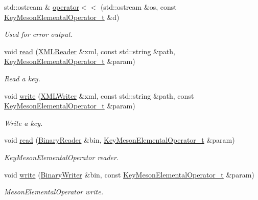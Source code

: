 \begin{DoxyCompactItemize}
std\+::ostream \& \mbox{\hyperlink{namespaceHadron_a24d0db7f972f8d517641ad9235bfa33c}{operator$<$$<$}} (std\+::ostream \&os, const \mbox{\hyperlink{structHadron_1_1KeyMesonElementalOperator__t}{Key\+Meson\+Elemental\+Operator\+\_\+t}} \&d)
\begin{DoxyCompactList}\small\item\em Used for error output. \end{DoxyCompactList}\item 
void \mbox{\hyperlink{namespaceHadron_adde6149254919751c9f0e1b2b12c4d17}{read}} (\mbox{\hyperlink{classADATXML_1_1XMLReader}{X\+M\+L\+Reader}} \&xml, const std\+::string \&path, \mbox{\hyperlink{structHadron_1_1KeyMesonElementalOperator__t}{Key\+Meson\+Elemental\+Operator\+\_\+t}} \&param)
\begin{DoxyCompactList}\small\item\em Read a key. \end{DoxyCompactList}\item 
void \mbox{\hyperlink{namespaceHadron_ad432e121844a2fa83775051e43481116}{write}} (\mbox{\hyperlink{classADATXML_1_1XMLWriter}{X\+M\+L\+Writer}} \&xml, const std\+::string \&path, const \mbox{\hyperlink{structHadron_1_1KeyMesonElementalOperator__t}{Key\+Meson\+Elemental\+Operator\+\_\+t}} \&param)
\begin{DoxyCompactList}\small\item\em Write a key. \end{DoxyCompactList}\item 
void \mbox{\hyperlink{namespaceHadron_ae6acb258c409e20fdd2a36b3266138bc}{read}} (\mbox{\hyperlink{classADATIO_1_1BinaryReader}{Binary\+Reader}} \&bin, \mbox{\hyperlink{structHadron_1_1KeyMesonElementalOperator__t}{Key\+Meson\+Elemental\+Operator\+\_\+t}} \&param)
\begin{DoxyCompactList}\small\item\em Key\+Meson\+Elemental\+Operator reader. \end{DoxyCompactList}\item 
void \mbox{\hyperlink{namespaceHadron_abb7bfe7ab47ecc24ac8d489bdaf701d2}{write}} (\mbox{\hyperlink{classADATIO_1_1BinaryWriter}{Binary\+Writer}} \&bin, const \mbox{\hyperlink{structHadron_1_1KeyMesonElementalOperator__t}{Key\+Meson\+Elemental\+Operator\+\_\+t}} \&param)
\begin{DoxyCompactList}\small\item\em Meson\+Elemental\+Operator write. \end{DoxyCompactList}\item 

\end{DoxyCompactItemize}
